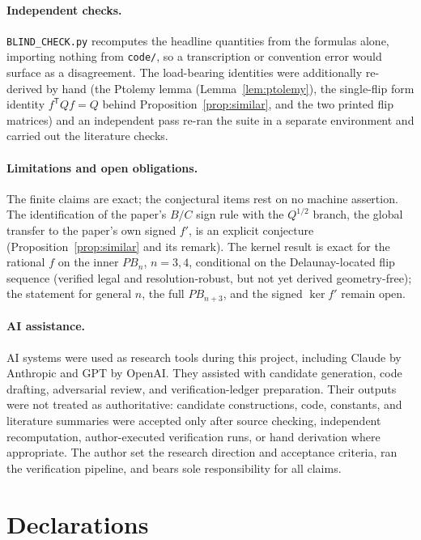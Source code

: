 \documentclass[11pt]{article}
\theoremstyle{plain}
\theoremstyle{definition}
\theoremstyle{remark}
\begin{document}
\paragraph{Independent checks.} \texttt{BLIND\_CHECK.py} recomputes the headline quantities from the
formulas alone, importing nothing from \texttt{code/}, so a transcription or convention error would surface
as a disagreement. The load-bearing identities were additionally re-derived by hand (the Ptolemy lemma
(Lemma~\ref{lem:ptolemy}), the single-flip form identity $f^{\mathsf T}Qf=Q$ behind
Proposition~\ref{prop:similar}, and the two printed flip matrices) and an independent pass re-ran
the suite in a separate environment and carried out the literature checks.

\paragraph{Limitations and open obligations.} The finite claims are exact; the conjectural items rest on no
machine assertion. The identification of the paper's $B/C$ sign rule with the $Q^{1/2}$ branch, the
global transfer to the paper's own signed $f'$, is an explicit conjecture (Proposition~\ref{prop:similar}
and its remark). The kernel result is exact for the rational $f$ on the inner $PB_n$, $n=3,4$, conditional
on the Delaunay-located flip sequence (verified legal and resolution-robust, but not yet derived
geometry-free); the statement for general $n$, the full $PB_{n+3}$, and the signed $\ker f'$ remain open.

\paragraph{AI assistance.} AI systems were used as research tools during this project, including Claude by
Anthropic and GPT by OpenAI. They assisted with candidate generation, code drafting, adversarial review, and
verification-ledger preparation. Their outputs were not treated as authoritative: candidate constructions,
code, constants, and literature summaries were accepted only after source checking, independent
recomputation, author-executed verification runs, or hand derivation where appropriate. The author set the
research direction and acceptance criteria, ran the verification pipeline, and bears sole responsibility for
all claims.

\section*{Declarations}
\end{document}
